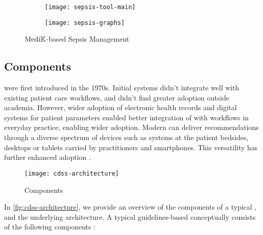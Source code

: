 %

\begin{figure*}[t!]
  \begin{subfigure}[t]{0.69\textwidth}
    \centering
    \texttt{[image: sepsis-tool-main]}
    \label{fig:sepsis-tool-main}
  \end{subfigure}
  \begin{subfigure}[t]{0.3\textwidth}
    \centering
    \texttt{[image: sepsis-graphs]}
    \label{fig:sepsis-graphs-view}
  \end{subfigure}
  \caption{$\text{Medi}\mathbb{K}{}{}$-based Sepsis Management \CDSS{}}\label{fig:sepsis-tool}
\end{figure*}

\subsection{\CDSS{} Components}\label{sec:cdss-components}

\CDSSs{} were first introduced in the 1970s. Initial systems
didn't integrate well with existing patient care workflows, and
didn't find greater adoption outside academia. However,
wider adoption of electronic health records and digital systems for
patient parameters enabled better integration of \CDSSs{} with
workflows in everyday practice, enabling wider adoption.
Modern \CDSS{} can deliver recommendations
through a diverse spectrum of devices such
as systems at the patient bedsides, desktops or tablets carried by
practitioners and smartphones. This versatility
has further enhanced \CDSSs{} adoption \cite{SuttonNature20}.

\begin{figure}[t!]
  \centering
  \texttt{[image: cdss-architecture]}
  \caption{\CDSS{} Components}\label{fig:cdss-architecture}
\end{figure}

In \autoref{fig:cdss-architecture}, we provide an overview
of the components of a typical \CDSS{}, and the underlying architecture.
A typical guidelines-based \CDSS{} conceptually consists of the
following components \cite{SuttonNature20}:

